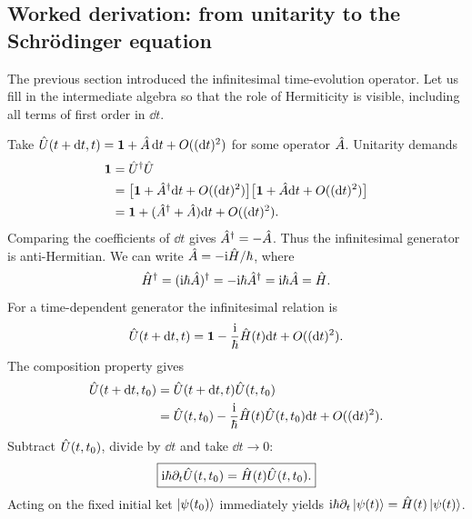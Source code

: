 \subsection*{Worked derivation: from unitarity to the Schr\"odinger equation}
The previous section introduced the infinitesimal time-evolution operator.
Let us fill in the intermediate algebra so that the role of
Hermiticity is visible, including all terms of first order in $\dd t$.

Take $\hat{U}(t+\mathrm{d} t,t)=\mathbf1+\hat{A}\,\mathrm{d} t+
O((\mathrm{d} t)^2)$ for some operator $\hat{A}$.
Unitarity demands
\begin{align}
\mathbf1
&=\hat{U}^\dagger\hat{U}\notag\\
&=\bigl[\mathbf1+\hat{A}^\dagger\mathrm{d} t+O((\mathrm{d} t)^2)\bigr]
  \bigl[\mathbf1+\hat{A}\mathrm{d} t+O((\mathrm{d} t)^2)\bigr]\notag\\
&=\mathbf1+(\hat{A}^\dagger+\hat{A})\mathrm{d} t
  +O((\mathrm{d} t)^2).
\end{align}
Comparing the coefficients of $\dd t$ gives
$\hat{A}^\dagger=-\hat{A}$. Thus the infinitesimal
generator is anti-Hermitian. We can write
$\hat{A}=-\mathrm{i}\hat{H}/\hbar$, where
\begin{equation}
\hat{H}^\dagger
=(\mathrm{i}\hbar\hat{A})^\dagger
=-\mathrm{i}\hbar\hat{A}^\dagger
=\mathrm{i}\hbar\hat{A}=\hat{H}.
\end{equation}
For a time-dependent generator the infinitesimal relation is
\begin{equation}
\hat{U}(t+\mathrm{d} t,t)=
\mathbf1-\frac{\mathrm{i}}{\hbar}\hat{H}(t)\mathrm{d} t
+O((\mathrm{d} t)^2).
\end{equation}
The composition property gives
\begin{align}
\hat{U}(t+\mathrm{d} t,t_0)
&=\hat{U}(t+\mathrm{d} t,t)\hat{U}(t,t_0)\notag\\
&=\hat{U}(t,t_0)-\frac{\mathrm{i}}{\hbar}
 \hat{H}(t)\hat{U}(t,t_0)\mathrm{d} t+O((\mathrm{d} t)^2).
\end{align}
Subtract $\hat{U}(t,t_0)$, divide by $\dd t$ and
take $\dd t\to0$:
\begin{equation}
\boxed{\mathrm{i}\hbar\partial_t\hat{U}(t,t_0)
=\hat{H}(t)\hat{U}(t,t_0).}
\end{equation}
Acting on the fixed initial ket $\left|\psi(t_0)\right\rangle$
immediately yields
$\mathrm{i}\hbar\partial_t\left|\psi(t)\right\rangle
=\hat{H}(t)\left|\psi(t)\right\rangle$.

